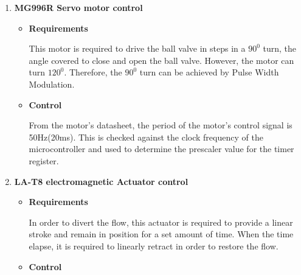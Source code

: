 \begin{enumerate}
    \item \textbf{MG996R Servo motor control}
    \par
    \begin{itemize}
        \item \textbf{Requirements}
        \par
        This motor is required to drive the ball valve in steps in a $90^{0}$ turn, the angle covered to close and open the ball valve. However, the motor can turn $120^{0}$. Therefore, the $90^{0}$ turn can be achieved by Pulse Width Modulation. 
        \item \textbf{Control}
        \par
        From the motor's datasheet, the period of the motor's control signal is 50Hz(20ms). This is checked against the clock frequency of the microcontroller and used to determine the prescaler value for the timer register.
        \par
    \end{itemize}
    \item \textbf{LA-T8 electromagnetic Actuator control}
    \par
    \begin{itemize}
        \item \textbf{Requirements}
        \par
        In order to divert the flow, this actuator is required to provide a linear stroke and remain in position for a set amount of time. When the time elapse, it is required to linearly retract in order to restore the flow. 
        \item \textbf{Control}

\end{itemize}
\end{enumerate}
